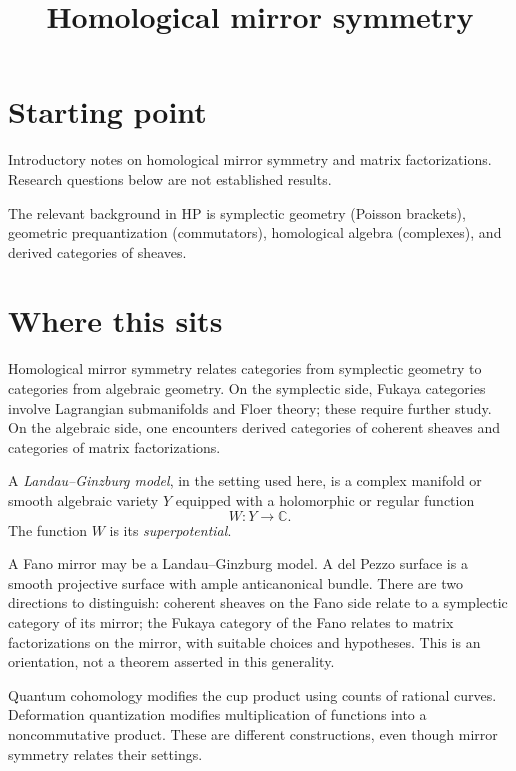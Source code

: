 


\title{Homological mirror symmetry}
\maketitle
\tableofcontents

\section{Starting point}
\label{section-starting-point}

\noindent
Introductory notes on homological
mirror symmetry and matrix
factorizations. Research questions
below are not established results.

The relevant background in HP is
symplectic geometry (Poisson brackets),
geometric prequantization (commutators),
homological algebra (complexes), and
derived categories of sheaves.

\section{Where this sits}
\label{section-where-this-sits}

\noindent
Homological mirror symmetry relates
categories from symplectic geometry
to categories from algebraic geometry.
On the symplectic side, Fukaya categories
involve Lagrangian submanifolds and
Floer theory; these require further study.
On the algebraic side, one encounters
derived categories of coherent sheaves
and categories of matrix factorizations.

\begin{definition}
\label{definition-lg-model}
A \textit{Landau--Ginzburg model}, in
the setting used here, is a complex
manifold or smooth algebraic variety
$Y$ equipped with a holomorphic or
regular function
$$
W:Y\longrightarrow\mathbb{C}.
$$
The function $W$ is its
\textit{superpotential}.
\end{definition}

\noindent
A Fano mirror may be a Landau--Ginzburg
model. A del Pezzo surface is a smooth
projective surface with ample
anticanonical bundle.
There are two directions to distinguish:
coherent sheaves on the Fano side relate
to a symplectic category of its mirror;
the Fukaya category of the Fano relates
to matrix factorizations on the mirror,
with suitable choices and hypotheses.
This is an orientation, not a theorem
asserted in this generality.

Quantum cohomology modifies the cup
product using counts of rational curves.
Deformation quantization modifies
multiplication of functions into a
noncommutative product. These are
different constructions, even though
mirror symmetry relates their settings.


